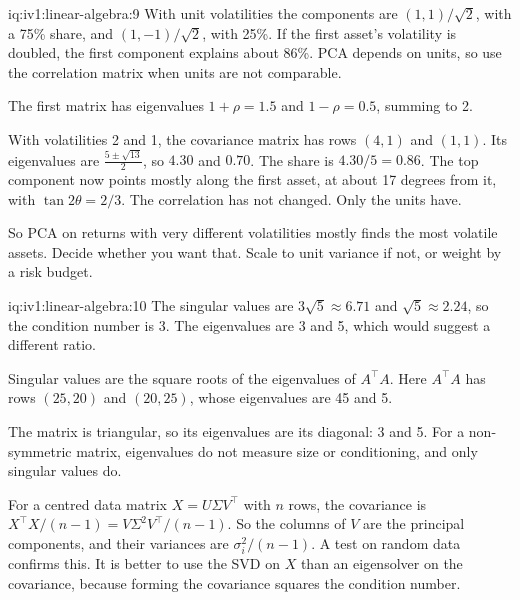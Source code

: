 \begin{solution}{iq:iv1:linear-algebra:9}
With unit volatilities the components are $(1, 1)/\sqrt{2}$, with a 75\% share, and $(1, -1)/\sqrt{2}$, with 25\%. If the first asset's volatility is doubled, the first component explains about 86\%. PCA depends on units, so use the correlation matrix when units are not comparable.

The first matrix has eigenvalues $1 + \rho = 1.5$ and $1 - \rho = 0.5$, summing to 2.

With volatilities 2 and 1, the covariance matrix has rows $(4, 1)$ and $(1, 1)$. Its eigenvalues are $\frac{5 \pm \sqrt{13}}{2}$, so $4.30$ and $0.70$. The share is $4.30/5 = 0.86$. The top component now points mostly along the first asset, at about 17 degrees from it, with $\tan 2\theta = 2/3$. The correlation has not changed. Only the units have.

So PCA on returns with very different volatilities mostly finds the most volatile assets. Decide whether you want that. Scale to unit variance if not, or weight by a risk budget.

\end{solution}

\begin{solution}{iq:iv1:linear-algebra:10}
The singular values are $3\sqrt{5} \approx 6.71$ and $\sqrt{5} \approx 2.24$, so the condition number is 3. The eigenvalues are 3 and 5, which would suggest a different ratio.

Singular values are the square roots of the eigenvalues of $A^\top A$. Here $A^\top A$ has rows $(25, 20)$ and $(20, 25)$, whose eigenvalues are 45 and 5.

The matrix is triangular, so its eigenvalues are its diagonal: 3 and 5. For a non-symmetric matrix, eigenvalues do not measure size or conditioning, and only singular values do.

For a centred data matrix $X = U\Sigma V^\top$ with $n$ rows, the covariance is $X^\top X/(n - 1) = V\Sigma^2V^\top/(n - 1)$. So the columns of $V$ are the principal components, and their variances are $\sigma_i^2/(n - 1)$. A test on random data confirms this. It is better to use the SVD on $X$ than an eigensolver on the covariance, because forming the covariance squares the condition number.

\end{solution}

